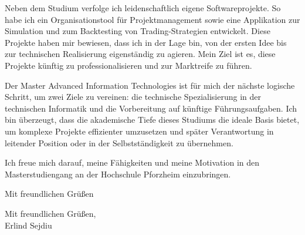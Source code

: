 \documentclass[a4paper, 10pt]{letter}
\begin{document}
\begin{letter}
Neben dem Studium verfolge ich leidenschaftlich eigene Softwareprojekte. So habe ich ein Organisationstool für Projektmanagement sowie eine Applikation zur Simulation und zum Backtesting von Trading-Strategien entwickelt. Diese Projekte haben mir bewiesen, dass ich in der Lage bin, von der ersten Idee bis zur technischen Realisierung eigenständig zu agieren. Mein Ziel ist es, diese Projekte künftig zu professionalisieren und zur Marktreife zu führen.

Der Master Advanced Information Technologies ist für mich der nächste logische Schritt, um zwei Ziele zu vereinen: die technische Spezialisierung in der technischen Informatik und die Vorbereitung auf künftige Führungsaufgaben. Ich bin überzeugt, dass die akademische Tiefe dieses Studiums die ideale Basis bietet, um komplexe Projekte effizienter umzusetzen und später Verantwortung in leitender Position oder in der Selbstständigkeit zu übernehmen.

Ich freue mich darauf, meine Fähigkeiten und meine Motivation in den Masterstudiengang an der Hochschule Pforzheim einzubringen.

Mit freundlichen Grüßen

\closing{Mit freundlichen Grüßen,\\ Erlind Sejdiu}

\end{letter}
\end{document}
